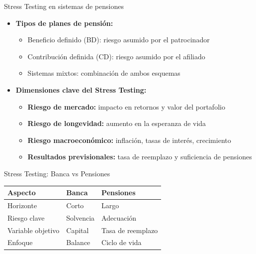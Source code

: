 \documentclass{beamer}
\begin{document}
\begin{frame}{Stress Testing en sistemas de pensiones}

\begin{itemize}

\item \textbf{Tipos de planes de pensión:}  
\begin{itemize}
    \item Beneficio definido (BD): riesgo asumido por el patrocinador  
    \item Contribución definida (CD): riesgo asumido por el afiliado  
    \item Sistemas mixtos: combinación de ambos esquemas
\end{itemize}

\vspace{0.3cm}

\item \textbf{Dimensiones clave del Stress Testing:}  
\begin{itemize}
    \item \textbf{Riesgo de mercado:} impacto en retornos y valor del portafolio  
    \item \textbf{Riesgo de longevidad:} aumento en la esperanza de vida  
    \item \textbf{Riesgo macroeconómico:} inflación, tasas de interés, crecimiento  
    \item \textbf{Resultados previsionales:} tasa de reemplazo y suficiencia de pensiones
\end{itemize}

\end{itemize}

\end{frame}
\begin{frame}[t]{Stress Testing: Banca vs Pensiones}
\begin{tabular}{|l|l|l|}
\hline
\textbf{Aspecto} & \textbf{Banca} & \textbf{Pensiones} \\
\hline
Horizonte & Corto & Largo \\
Riesgo clave & Solvencia & Adecuación \\
Variable objetivo & Capital & Tasa de reemplazo \\
Enfoque & Balance & Ciclo de vida \\
\hline
\end{tabular}
\end{frame}
\end{document}
